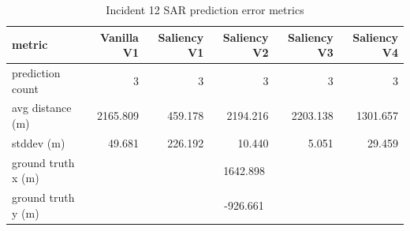 \begin{table}[ht]
\centering
\caption{Incident 12 SAR prediction error metrics}
\label{tab:sar-incident-12}
\begin{tabular}{lrrrrr}
\hline
metric & Vanilla V1 & Saliency V1 & Saliency V2 & Saliency V3 & Saliency V4 \\
\hline
prediction count & 3 & 3 & 3 & 3 & 3 \\
avg distance (m) & 2165.809 & 459.178 & 2194.216 & 2203.138 & 1301.657 \\
stddev (m) & 49.681 & 226.192 & 10.440 & 5.051 & 29.459 \\
ground truth x (m) & \multicolumn{5}{c}{1642.898} \\
ground truth y (m) & \multicolumn{5}{c}{-926.661} \\
\hline
\end{tabular}
\end{table}
